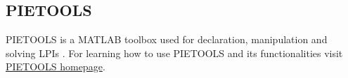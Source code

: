 \subsection{PIETOOLS}
PIETOOLS is a MATLAB toolbox used for declaration, manipulation and solving LPIs \cite{9147712}. For learning how to use PIETOOLS and its functionalities visit \href{https://control.asu.edu/pietools/pietools}{PIETOOLS homepage}.

